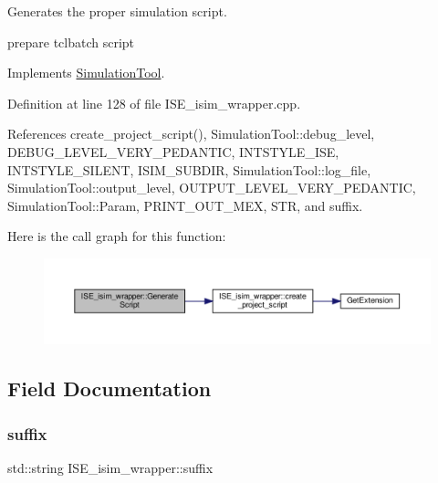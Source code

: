 Generates the proper simulation script. 

prepare tclbatch script 

Implements \hyperlink{classSimulationTool_afd99529bb7adb46081071097ceae7643}{Simulation\+Tool}.



Definition at line 128 of file I\+S\+E\+\_\+isim\+\_\+wrapper.\+cpp.



References create\+\_\+project\+\_\+script(), Simulation\+Tool\+::debug\+\_\+level, D\+E\+B\+U\+G\+\_\+\+L\+E\+V\+E\+L\+\_\+\+V\+E\+R\+Y\+\_\+\+P\+E\+D\+A\+N\+T\+IC, I\+N\+T\+S\+T\+Y\+L\+E\+\_\+\+I\+SE, I\+N\+T\+S\+T\+Y\+L\+E\+\_\+\+S\+I\+L\+E\+NT, I\+S\+I\+M\+\_\+\+S\+U\+B\+D\+IR, Simulation\+Tool\+::log\+\_\+file, Simulation\+Tool\+::output\+\_\+level, O\+U\+T\+P\+U\+T\+\_\+\+L\+E\+V\+E\+L\+\_\+\+V\+E\+R\+Y\+\_\+\+P\+E\+D\+A\+N\+T\+IC, Simulation\+Tool\+::\+Param, P\+R\+I\+N\+T\+\_\+\+O\+U\+T\+\_\+\+M\+EX, S\+TR, and suffix.

Here is the call graph for this function\+:
\nopagebreak
\begin{figure}[H]
\begin{center}
\leavevmode
\includegraphics[width=350pt]{d2/d37/classISE__isim__wrapper_a7f67c0aa82f1959d7327f05cb4504477_cgraph}
\end{center}
\end{figure}


\subsection{Field Documentation}
\mbox{\label{classISE__isim__wrapper_a372513ac46467fd73931d3798ad75e1b}} 
\subsubsection{\texorpdfstring{suffix}{suffix}}
{\footnotesize\ttfamily std\+::string I\+S\+E\+\_\+isim\+\_\+wrapper\+::suffix\hspace{0.3cm}{\ttfamily [private]}}



